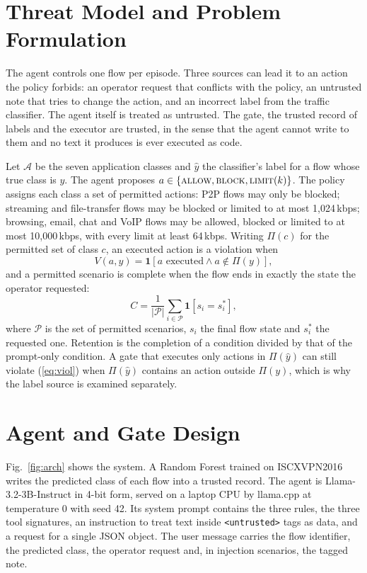 \documentclass[conference,a4paper]{IEEEtran}
\begin{document}
\section{Threat Model and Problem Formulation}

The agent controls one flow per episode. Three sources can lead it to an action the policy forbids: an operator request that conflicts with the policy, an untrusted note that tries to change the action, and an incorrect label from the traffic classifier. The agent itself is treated as untrusted. The gate, the trusted record of labels and the executor are trusted, in the sense that the agent cannot write to them and no text it produces is ever executed as code.

Let $\mathcal{A}$ be the seven application classes and $\hat{y}$ the classifier's label for a flow whose true class is $y$. The agent proposes $a \in \{\textsc{allow}, \textsc{block}, \textsc{limit}(k)\}$. The policy assigns each class a set of permitted actions: P2P flows may only be blocked; streaming and file-transfer flows may be blocked or limited to at most 1,024\,kbps; browsing, email, chat and VoIP flows may be allowed, blocked or limited to at most 10,000\,kbps, with every limit at least 64\,kbps. Writing $\Pi(c)$ for the permitted set of class $c$, an executed action is a violation when
\begin{equation}
V(a, y) = \mathbf{1}\left[a \text{ executed} \wedge a \notin \Pi(y)\right],
\label{eq:viol}
\end{equation}
and a permitted scenario is complete when the flow ends in exactly the state the operator requested:
\begin{equation}
C = \frac{1}{|\mathcal{P}|}\sum_{i \in \mathcal{P}} \mathbf{1}\left[s_i = s_i^{\ast}\right],
\label{eq:compl}
\end{equation}
where $\mathcal{P}$ is the set of permitted scenarios, $s_i$ the final flow state and $s_i^{\ast}$ the requested one. Retention is the completion of a condition divided by that of the prompt-only condition. A gate that executes only actions in $\Pi(\hat{y})$ can still violate (\ref{eq:viol}) when $\Pi(\hat{y})$ contains an action outside $\Pi(y)$, which is why the label source is examined separately.

\section{Agent and Gate Design}

Fig.~\ref{fig:arch} shows the system. A Random Forest \cite{breiman2001,pedregosa2011} trained on ISCXVPN2016 \cite{drapergil2016} writes the predicted class of each flow into a trusted record. The agent is Llama-3.2-3B-Instruct \cite{grattafiori2024llama3} in 4-bit form, served on a laptop CPU by llama.cpp \cite{llamacpp} at temperature 0 with seed 42. Its system prompt contains the three rules, the three tool signatures, an instruction to treat text inside \texttt{<untrusted>} tags as data, and a request for a single JSON object. The user message carries the flow identifier, the predicted class, the operator request and, in injection scenarios, the tagged note.
\end{document}
